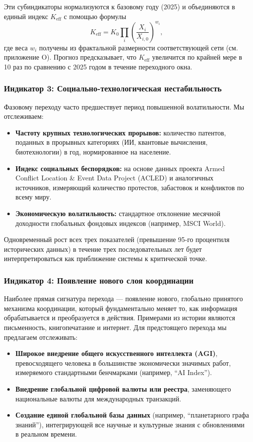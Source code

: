\documentclass[12pt,a4paper]{article}
\theoremstyle{remark}
\begin{document}
	Эти субиндикаторы нормализуются к базовому году (2025) и объединяются в единый индекс $K_{\text{eff}}$ с помощью формулы
	\[
	K_{\text{eff}} = K_0 \prod_{i} \left(\frac{X_i}{X_{i,0}}\right)^{w_i},
	\]
	где веса $w_i$ получены из фрактальной размерности соответствующей сети (см. приложение O). Прогноз предсказывает, что $K_{\text{eff}}$ увеличится по крайней мере в 10 раз по сравнению с 2025 годом в течение переходного окна.
	
	\subsubsection{Индикатор 3: Социально-технологическая нестабильность}
	
	Фазовому переходу часто предшествует период повышенной волатильности. Мы отслеживаем:
	
	\begin{itemize}
		\item \textbf{Частоту крупных технологических прорывов:} количество патентов, поданных в прорывных категориях (ИИ, квантовые вычисления, биотехнологии) в год, нормированное на население.
		\item \textbf{Индекс социальных беспорядков:} на основе данных проекта Armed Conflict Location \& Event Data Project (ACLED) и аналогичных источников, измеряющий количество протестов, забастовок и конфликтов по всему миру.
		\item \textbf{Экономическую волатильность:} стандартное отклонение месячной доходности глобальных фондовых индексов (например, MSCI World).
	\end{itemize}
	
	Одновременный рост всех трех показателей (превышение 95-го процентиля исторических данных) в течение трех последовательных лет будет интерпретироваться как приближение системы к критической точке.
	
	\subsubsection{Индикатор 4: Появление нового слоя координации}
	
	Наиболее прямая сигнатура перехода — появление нового, глобально принятого механизма координации, который фундаментально меняет то, как информация обрабатывается и преобразуется в действия. Примерами из истории являются письменность, книгопечатание и интернет. Для предстоящего перехода мы предлагаем отслеживать:
	
	\begin{itemize}
		\item \textbf{Широкое внедрение общего искусственного интеллекта (AGI)}, превосходящего человека в большинстве экономически значимых работ, измеряемого стандартными бенчмарками (например, ``AI Index'').
		\item \textbf{Внедрение глобальной цифровой валюты или реестра}, заменяющего национальные валюты для международных транзакций.
		\item \textbf{Создание единой глобальной базы данных} (например, ``планетарного графа знаний''), интегрирующей все научные и культурные знания с обновлениями в реальном времени.
	\end{itemize}
	
\end{document}
